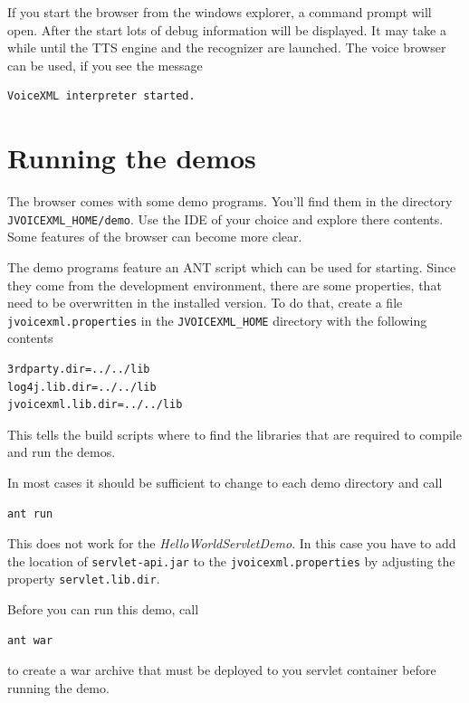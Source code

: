 \documentclass[11pt,a4paper]{article}
\begin{document}
If you start the browser from the windows explorer, a command prompt will open.
After the start lots of debug information will be displayed.
It may take a while until the TTS engine and the recognizer are launched.
The voice browser can be used, if you see the message

\begin{lstlisting}
VoiceXML interpreter started.
\end{lstlisting}

\section{Running the demos}

The browser comes with some demo programs. You'll find them in the
directory \texttt{JVOICEXML\_HOME/demo}. Use the IDE of your choice
and explore there contents. Some features of the browser can 
become more clear.

The demo programs feature an ANT script which can be used for starting.
Since they come from the development environment, there are some
properties, that need to be overwritten in the installed version.
To do that, create a file \texttt{jvoicexml.properties} in the
\texttt{JVOICEXML\_HOME} directory with the following contents

\begin{lstlisting}
3rdparty.dir=../../lib
log4j.lib.dir=../../lib
jvoicexml.lib.dir=../../lib
\end{lstlisting}

This tells the build scripts where to find the libraries that are required
to compile and run the demos.

In most cases it should be sufficient to change to each demo directory
and call

\begin{lstlisting}
ant run
\end{lstlisting}

This does not work for the \emph{HelloWorldServletDemo}. In this
case you have to add the location of \texttt{servlet-api.jar} to
the \texttt{jvoicexml.properties} by adjusting the property
\texttt{servlet.lib.dir}.

Before you can run this demo, call

\begin{lstlisting}
ant war
\end{lstlisting}

to create a war archive that must be deployed to you servlet container
before running the demo.
\end{document}
